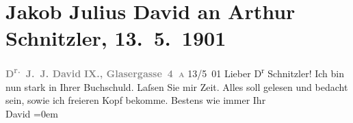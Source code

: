 

               \section[Jakob Julius David an Arthur Schnitzler, 13. 5. 1901]{ Jakob Julius David an Arthur Schnitzler, 13. 5. 1901}\nopagebreak{}\rehead{ }\begin{ledgroupsized}[t]{13cm}\normalsize\beginnumbering{} \toendnotes[C]{\smallbreak\pagebreak[2]} 
\pstart
           \noindent{}\centering{}{\pb}\textcolor{gray}{\textbf{D\textsuperscript{r.} J. J. David}}\pend
           \pstart
           \noindent{}\raggedleft{}\textcolor{gray}{\textbf{IX., Glasergasse 4 \textsc{a}}}\pend
           \pstart
           \raggedleft{}{\pb}13/5 01\pend
           \pstart\center{}Lieber D\textsuperscript{r} Schnitzler!\pend\pstart
           Ich bin nun stark in Ihrer Buchschuld. Laſsen Sie mir Zeit. Alles soll gelesen
                    und bedacht sein, sowie ich freieren Kopf bekomme.\pend
           \pstart
           Bestens wie immer Ihr{\\[\baselineskip]}\spacefill\mbox{David}\pend
           \leftskip=0em{}\endnumbering{}\end{ledgroupsized}  \newcommand{\dateiname}{L01119}\newcommand{\titel}{Jakob Julius David an Arthur Schnitzler, 13. 5. 1901}\newcommand{\editorInnen}{Martin Anton Müller und Gerd-Hermann Susen}
      